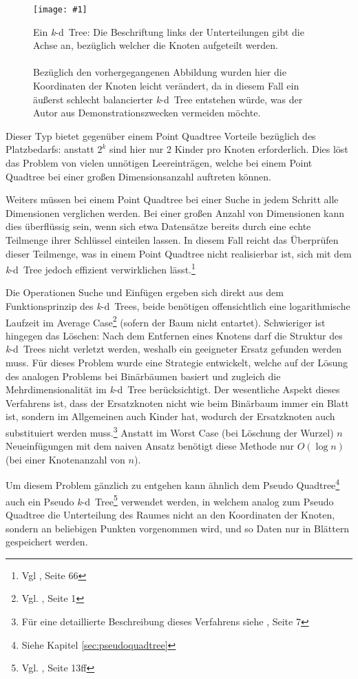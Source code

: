\documentclass[%
			paper=a4,%
			DIV12,
			liststotoc,
			bibtotoc,
			draft=false,%
			titlepage
			]{scrartcl}
\newcommand{\zit}[3]{#1 \cite{#2}, #3}
\newcommand{\footzit}[3]{\footnote{\zit{#1}{#2}{#3}}}
\newcommand{\kd}{\mbox{\textit{k}-d}}
\newcommand{\myfig}[5] {
 \begin{figure}[tbph]
	 \centering
	 \texttt{[image: \#1]}
	 \caption[#4]{#5}
	 \label{fig:#2}
 \end{figure}
}
\begin{document}
\myfig{img/kdtree-tree-full-trimmed}{kdtree}{width=.78\textwidth}{\kd\ Tree}{Ein \kd\ Tree: Die Beschriftung links der Unterteilungen gibt die Achse an, bezüglich welcher die Knoten aufgeteilt werden.
\\ \\
Bezüglich den vorhergegangenen Abbildung wurden hier die Koordinaten der Knoten leicht verändert, da in diesem Fall ein äußerst schlecht balancierter \kd\ Tree entstehen würde, was der Autor aus Demonstrationszwecken vermeiden möchte.}

Dieser Typ bietet gegenüber einem Point Quadtree Vorteile bezüglich des Platzbedarfs:
anstatt $2^k$ sind hier nur 2 Kinder pro Knoten erforderlich.
Dies löst das Problem von vielen unnötigen Leereinträgen, welche bei einem Point Quadtree bei einer großen Dimensionsanzahl auftreten können.

Weiters müssen bei einem Point Quadtree bei einer Suche in jedem Schritt alle Dimensionen verglichen werden.
Bei einer großen Anzahl von Dimensionen kann dies überflüssig sein, wenn sich etwa Datensätze bereits durch eine echte Teilmenge ihrer Schlüssel einteilen lassen.
In diesem Fall reicht das Überprüfen dieser Teilmenge,
was in einem Point Quadtree nicht realisierbar ist, sich mit dem \kd\ Tree jedoch effizient verwirklichen lässt.\footzit{Vgl}{Samet90}{Seite 66}

Die Operationen Suche und Einfügen ergeben sich direkt aus dem Funktionsprinzip des \kd\ Trees, beide benötigen offensichtlich eine logarithmische Laufzeit im Average Case\footzit{Vgl.}{Bentley:1975}{Seite 1} (sofern der Baum nicht entartet).
Schwieriger ist hingegen das Löschen:
Nach dem Entfernen eines Knotens darf die Struktur des \kd\ Trees nicht verletzt werden, weshalb ein geeigneter Ersatz gefunden werden muss.
Für dieses Problem wurde eine Strategie entwickelt, welche auf der Lösung des analogen Problems bei Binärbäumen basiert und zugleich die Mehrdimensionalität im \kd\ Tree berücksichtigt.
Der wesentliche Aspekt dieses Verfahrens ist, dass der Ersatzknoten nicht wie beim Binärbaum immer ein Blatt ist, sondern im Allgemeinen auch Kinder hat, wodurch der Ersatzknoten auch substituiert werden muss.\footzit{Für eine detaillierte Beschreibung dieses Verfahrens siehe}{Bentley:1975}{Seite 7} 
Anstatt im Worst Case (bei Löschung der Wurzel) $n$ Neueinfügungen mit dem naiven Ansatz benötigt diese Methode nur $O(\log n)$ (bei einer Knotenanzahl von $n$).

Um diesem Problem gänzlich zu entgehen kann ähnlich dem Pseudo Quadtree\footnote{Siehe Kapitel \ref{sec:pseudoquadtree}} auch ein Pseudo \kd\ Tree\footzit{Vgl.}{DBLP:journals/acta/OvermarsL82}{Seite 13ff} verwendet werden,
in welchem analog zum Pseudo Quadtree die Unterteilung des Raumes nicht an den Koordinaten der Knoten, sondern an beliebigen Punkten vorgenommen wird, und so Daten nur in Blättern gespeichert werden.
\end{document}
